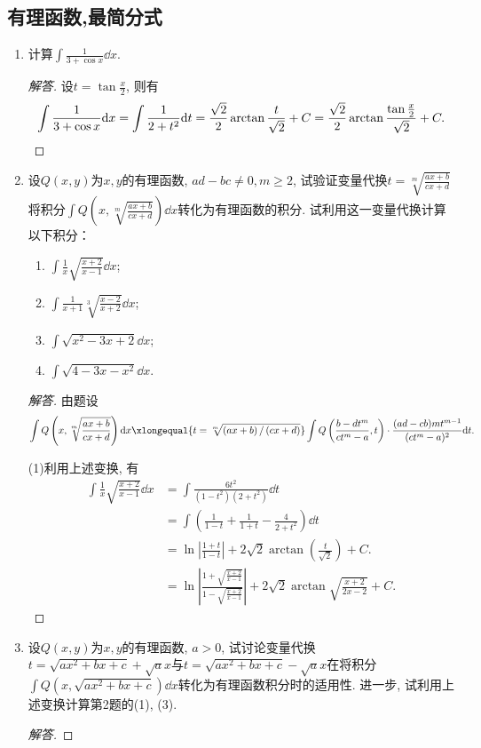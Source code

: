 \subsection{有理函数,最简分式}
\begin{4a}
\begin{enumerate}
\item 计算\(\int\frac{1}{3+\cos x}\dd x\).
\begin{proof}[解答]
设\(t=\tan\frac{x}{2}\), 则有\[\int\frac{1}{3+\cos x}\mathrm{d} x
=\int\frac{1}{2+t^2}\mathrm{d} t=\frac{\sqrt{2}}{2}\arctan\frac{t}{\sqrt{2}}+C
=\frac{\sqrt{2}}{2}\arctan\frac{\tan\frac{x}{2}}{\sqrt{2}}+C.\qedhere\]
\end{proof}
\item 设\(Q(x,y)\)为\(x,y\)的有理函数, \(ad-bc\ne 0,m\geqslant 2\), 
试验证变量代换\(t=\sqrt[m]{\frac{ax+b}{cx+d}}\)
将积分\(\int Q\left(x,\sqrt[m]{\frac{ax+b}{cx+d}}\right)\dd x\)转化为有理函数的积分. 
试利用这一变量代换计算以下积分：
\begin{enumerate}[label=(\arabic*)]
\item \(\int\frac{1}{x}\sqrt{\frac{x+2}{x-1}}\dd x\);
\item \(\int\frac{1}{x+1}\sqrt[3]{\frac{x-2}{x+2}}\dd x\);
\item \(\int\sqrt{x^2-3x+2}\dd x\);
\item \(\int\sqrt{4-3x-x^2}\dd x\).
\end{enumerate}
\begin{proof}[解答]
由题设
\[\int Q\left(x,\sqrt[m]{\frac{ax+b}{cx+d}}\right)\dd x\xlongequal{t=\sqrt[m]{\left( ax+b \right) /\left( cx+d \right)}}
\int Q\left(\frac{b-dt^m}{ct^m-a},t\right)\cdot\frac{(ad-cb)mt^{m-1}}{(ct^m-a)^2}\dd t.\]

(1)利用上述变换, 有\[\begin{aligned}
\int\frac{1}{x}\sqrt{\frac{x+2}{x-1}}\dd x
&=\int\frac{6t^2}{(1-t^2)(2+t^2)}\dd t\\
&=\int\left(\frac{1}{1-t}+\frac{1}{1+t}-\frac{4}{2+t^2}\right)\dd t\\
&=\ln\left|\frac{1+t}{1-t}\right|+2\sqrt{2}\arctan\left(\frac{t}{\sqrt{2}}\right)+C.\\
&=\ln\left|\frac{1+\sqrt{\frac{x+2}{x-1}}}{1-\sqrt{\frac{x+2}{x-1}}}\right|+2\sqrt{2}\arctan\sqrt{\frac{x+2}{2x-2}}+C.
\end{aligned}\]
\end{proof}
\item 设\(Q(x,y)\)为\(x,y\)的有理函数, \(a>0\), 试讨论变量代换\(t=\sqrt{ax^2+bx+c}+\sqrt{a}x\)与\(t=\sqrt{ax^2+bx+c}-\sqrt{a}x\)在将积分\(\int Q(x,\sqrt{ax^2+bx+c})\dd x\)转化为有理函数积分时的适用性. 
进一步, 试利用上述变换计算第2题的(1), (3).
\begin{proof}[解答]
	

\end{proof}
\end{enumerate}
\end{4a}
